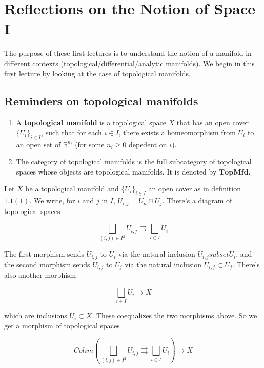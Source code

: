 \documentclass[../main.tex]{subfiles}
\begin{document}
\setcounter{chapter}{0}
\chapter{Reflections on the Notion of Space I}

The purpose of these first lectures is to understand the notion of a manifold in different contexts (topological/differential/analytic manifolds). We begin in this first lecture by looking at the case of topological manifolds.

\section{Reminders on topological manifolds}

\begin{defn}


\begin{enumerate}
    \item A \textbf{topological manifold} is a topological space $X$ that has an open cover $\{U_i\}_{i \in I}$, such that for each $i \in I$, there exists a homeomorphism from $U_i$ to an open set of $\mathbb R^{n_i}$ (for some $n_i\ge 0$ depedent on $i$).
    \item The category of topological manifolds is the full subcategory of topological spaces whose objects are topological manifolds. It is denoted by $\mathbf{TopMfd}$.
\end{enumerate}

\end{defn}

Let $X$ be a topological manifold and $\{U_i\}_{i \in I}$ an open cover as in definition $1.1 (1)$. We write, for $i$ and $j$ in $I$, $U_{i,j} = U_n \cap U_j$. There's a diagram of topological spaces

\[
    \bigsqcup_{(i, j) \in I^2} U_{i, j} \rightrightarrows \bigsqcup_{i \in I} U_i
\]

The first morphism sends $U_{i, j}$ to $U_i$ via the natural inclusion $U_{i,j}
subset U_i$, and the second morphism sends $U_{i, j}$ to $U_j$ via the natural inclusion $U_{i, j}
\subset U_j$. There's also another morphism

\[
    \bigsqcup_{i \in I} U_i \to X
\]

which are inclusions $U_i \subset X$. These coequalizes the two morphisms above. So we get a morphism of topological spaces

\[
Colim\left(\bigsqcup_{(i, j) \in I^2} U_{i, j} \rightrightarrows \bigsqcup_{i \in I} U_i\right) \to X
\]
\end{document}
